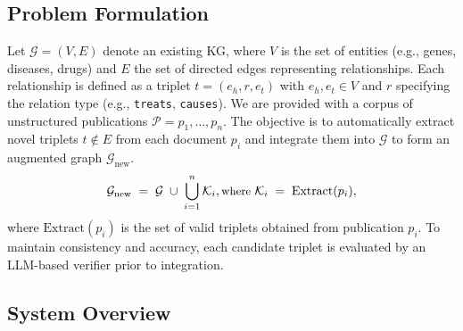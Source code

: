 \documentclass{article}
\begin{document}
\subsection{Problem Formulation}
Let $\mathcal{G} = (V, E)$ denote an existing KG, where $V$ is the set of entities (e.g., genes, diseases, drugs) and $E$ the set of directed edges representing relationships. Each relationship is defined as a triplet $t = (e_h, r, e_t)$ with $e_h, e_t \in V$ and $r$ specifying the relation type (e.g., \texttt{treats}, \texttt{causes}). We are provided with a corpus of unstructured publications $\mathcal{P} = {p_1, \ldots, p_n}$. The objective is to automatically extract novel triplets $t \notin E$ from each document $p_i$ and integrate them into $\mathcal{G}$ to form an augmented graph $\mathcal{G}_{\text{new}}$.
\begin{equation}
\fontsize{9pt}{7pt}\selectfont
\mathcal{G}_{\text{new}} \;=\; \mathcal{G} \;\cup\; \bigcup_{i=1}^{n} \mathcal{K}_i,
\text{where }
\mathcal{K}_i \;=\; \mathrm{Extract}(p_i),
\end{equation}
where $\mathrm{Extract}(p_i)$ is the set of valid triplets obtained from publication $p_i$. To maintain consistency and accuracy, each candidate triplet is evaluated by an LLM-based verifier prior to integration.

\subsection{System Overview}
\end{document}
